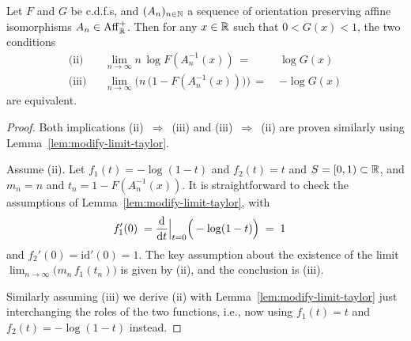 \begin{lemma}
  \label{lem:taylored-ev-limit}
  \leanok
  Let $F$ and $G$ be c.d.f.s, and $(A_n)_{n \in \mathbb{N}}$ a sequence of orientation
  preserving affine isomorphisms $A_n \in \mathrm{Aff}^+_{\mathbb{R}}$. Then for any $x \in \mathbb{R}$
  such that $0 < G(x) < 1$, the two conditions
  \begin{align*}
    \text{(ii)} & & \lim_{n \to \infty} n \, \log F (A_n^{-1}(x)) \, = \; & \log G(x) \\
    \text{(iii)} & & \lim_{n \to \infty} \Big( n \, \big(1 - F (A_n^{-1}(x)) \big) \Big)
      \, = \; & - \log G(x)
  \end{align*}
  are equivalent.
\end{lemma}
\begin{proof}

  Both implications {(ii) $\, \Rightarrow \,$ (iii)} and {(iii) $\, \Rightarrow \,$ (ii)}
  are proven similarly using Lemma~\ref{lem:modify-limit-taylor}.

  Assume (ii). Let $f_1(t) = - \log (1-t)$ and $f_2(t) = t$ and
  $S = [0,1) \subset \mathbb{R}$, and $m_n = n$ and $t_n = 1 - F (A_n^{-1}(x))$.
  It is straightforward to check the assumptions of Lemma~\ref{lem:modify-limit-taylor},
  with
  \begin{align*}
    f_1'(0) \; = \; & \frac{\mathrm{d}}{\mathrm{d} t} \Big|_{t=0} \Big( - \log (1 - t) \Big) \; = \; 1
  \end{align*}
  and $f_2'(0) = \mathrm{id}'(0) = 1$.
  The key assumption about the existence of
  the limit $\lim_{n \to \infty} \big( m_n \, f_1(t_n) \big)$ is given by (ii),
  and the conclusion is (iii).

  Similarly assuming (iii) we derive (ii) with Lemma~\ref{lem:modify-limit-taylor}
  just interchanging the roles of the two functions, i.e., now using
  $f_1(t) = t$ and $f_2(t) = - \log (1-t)$ instead.
\end{proof}

